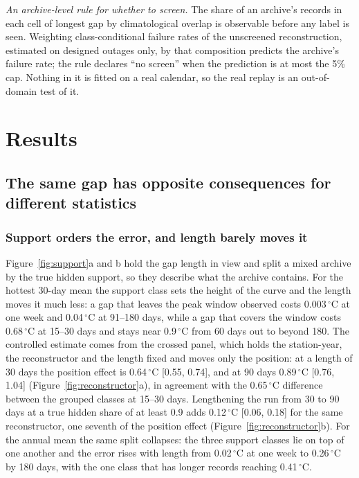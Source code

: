 \documentclass[draft]{agujournal2025}
\begin{document}
\emph{An archive-level rule for whether to screen.} The share of an archive's
records in each cell of longest gap by climatological overlap is observable
before any label is seen. Weighting class-conditional failure rates of the
unscreened reconstruction, estimated on designed outages only, by that
composition predicts the archive's failure rate; the rule declares ``no screen''
when the prediction is at most the 5\% cap. Nothing in it is fitted on a real
calendar, so the real replay is an out-of-domain test of it.

\section{Results}

\subsection{The same gap has opposite consequences for different statistics}

\subsubsection{Support orders the error, and length barely moves it}

Figure~\ref{fig:support}a and b hold the gap length in view and split a mixed
archive by the true hidden support, so they describe what the archive contains.
For the hottest 30-day mean the support class sets the height of the curve and
the length moves it much less: a gap that leaves the peak window
observed costs 0.003\,$^{\circ}$C at one week and 0.04\,$^{\circ}$C at
91--180 days, while a gap that covers the window costs 0.68\,$^{\circ}$C at
15--30 days and stays near 0.9\,$^{\circ}$C from 60 days out to beyond 180. The
controlled estimate comes from the crossed panel, which holds the station-year,
the reconstructor and the length fixed and moves only the position: at a length
of 30 days the position effect is 0.64\,$^{\circ}$C [0.55, 0.74], and at 90 days
0.89\,$^{\circ}$C [0.76, 1.04] (Figure~\ref{fig:reconstructor}a), in agreement
with the 0.65\,$^{\circ}$C difference between the grouped classes at 15--30 days.
Lengthening the run from 30 to 90 days at a true hidden share of at least 0.9
adds 0.12\,$^{\circ}$C [0.06, 0.18] for the same reconstructor, one seventh of
the position effect (Figure~\ref{fig:reconstructor}b). For the annual mean the same split collapses: the three support
classes lie on top of one another and the error rises with length from
0.02\,$^{\circ}$C at one week to 0.26\,$^{\circ}$C by 180 days, with the one
class that has longer records reaching 0.41\,$^{\circ}$C.
\end{document}

